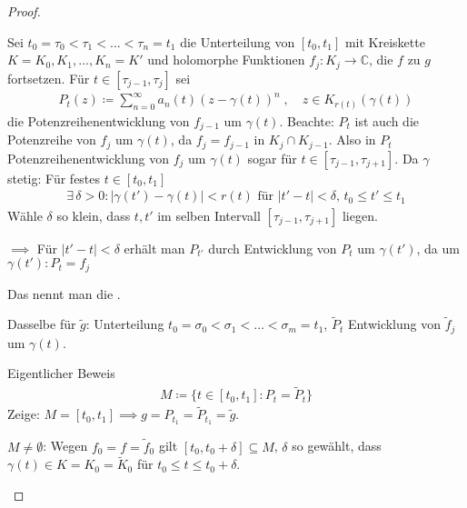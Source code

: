 \begin{theorem}[Satz]
\begin{proof}
\begin{enum-arab}
      Sei $t_0 = \tau_0 < \tau_1 < \ldots < \tau_n = t_1$ die Unterteilung von $[t_0,t_1]$ mit Kreiskette $K = K_0,K_1,\ldots,K_n=K'$ und holomorphe Funktionen $f_j : K_j \to \mathbb{C}$, die $f$ zu $g$ fortsetzen. Für $t \in [\tau_{j-1},\tau_j]$ sei
      \begin{align*}
        P_t(z) \coloneq \sum\limits_{n=0}^{\infty} a_n(t) (z-\gamma(t))^n \; , \quad z \in K_{r(t)}(\gamma(t))
      \end{align*}
      die Potenzreihenentwicklung von $f_{j-1}$ um $\gamma(t)$. Beachte: $P_t$ ist auch die Potenzreihe von $f_j$ um $\gamma(t)$, da $f_j = f_{j-1}$ in $K_j \cap K_{j-1}$. Also in $P_t$ Potenzreihenentwicklung von $f_j$ um $\gamma(t)$ sogar für $t \in [\tau_{j-1},\tau_{j+1}]$. Da $\gamma$ stetig: Für festes $t \in [t_0,t_1]$
      \begin{align*}
        \exists \, \delta > 0 : |\gamma(t') - \gamma(t)| < r(t) \text{ für } |t'-t| < \delta \text{, } t_0 \leq t' \leq t_1
      \end{align*}
      Wähle $\delta$ so klein, dass $t,t'$ im selben Intervall $[\tau_{j-1},\tau_{j+1}]$ liegen.
      
      $\implies$ Für $|t'-t| < \delta$ erhält man $P_{t'}$ durch Entwicklung von $P_t$ um $\gamma(t')$, da um $\gamma(t') : P_t = f_j$
      
      Das nennt man die .
      
      Dasselbe für $\widetilde{g}$: Unterteilung $t_0 = \sigma_0 < \sigma_1 < \ldots < \sigma_m = t_1$, $\widetilde{P}_t$ Entwicklung von $\widetilde{f}_j$ um $\gamma(t)$.
      
      \item Eigentlicher Beweis
      \begin{align*}
        M \coloneq \{t \in [t_0,t_1] : P_t = \widetilde{P}_t \}
      \end{align*}
      Zeige: $M = [t_0,t_1] \implies g = P_{t_1} = \widetilde{P}_{t_1} = \widetilde{g}$.
      \begin{enum-arab}
        \item \label{itm:5.6 a)} $M \neq \emptyset$: Wegen $f_0 = f = \widetilde{f}_0$ gilt $[t_0,t_0 + \delta] \subseteq M$, $\delta$ so gewählt, dass $\gamma(t) \in K = K_0 = \widetilde{K}_0$ für $t_0 \leq t \leq t_0 + \delta$.
        

\end{enum-arab}
\end{enum-arab}
\end{proof}
\end{theorem}
